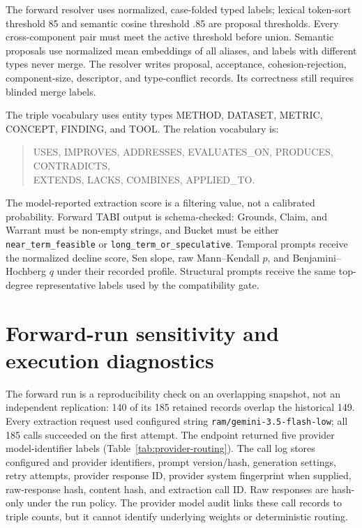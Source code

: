 \documentclass[runningheads]{llncs}
\begin{document}
The forward resolver uses normalized, case-folded typed labels; lexical token-sort threshold 85 and semantic cosine threshold .85 are proposal thresholds. Every cross-component pair must meet the active threshold before union. Semantic proposals use normalized mean embeddings of all aliases, and labels with different types never merge. The resolver writes proposal, acceptance, cohesion-rejection, component-size, descriptor, and type-conflict records. Its correctness still requires blinded merge labels.

The triple vocabulary uses entity types METHOD, DATASET, METRIC, CONCEPT, FINDING, and TOOL. The relation vocabulary is:
\begin{quote}\scriptsize
USES, IMPROVES, ADDRESSES, EVALUATES\_ON, PRODUCES, CONTRADICTS,\\
EXTENDS, LACKS, COMBINES, APPLIED\_TO.
\end{quote}
The model-reported extraction score is a filtering value, not a calibrated probability. Forward TABI output is schema-checked: Grounds, Claim, and Warrant must be non-empty strings, and Bucket must be either \texttt{near\_term\_feasible} or \texttt{long\_term\_or\_speculative}. Temporal prompts receive the normalized decline score, Sen slope, raw Mann--Kendall $p$, and Benjamini--Hochberg $q$ under their recorded profile. Structural prompts receive the same top-degree representative labels used by the compatibility gate.

\section{Forward-run sensitivity and execution diagnostics}
The forward run is a reproducibility check on an overlapping snapshot, not an independent replication: 140 of its 185 retained records overlap the historical 149. Every extraction request used configured string \texttt{ram/gemini-3.5-flash-low}; all 185 calls succeeded on the first attempt. The endpoint returned five provider model-identifier labels (Table~\ref{tab:provider-routing}). The call log stores configured and provider identifiers, prompt version/hash, generation settings, retry attempts, provider response ID, provider system fingerprint when supplied, raw-response hash, content hash, and extraction call ID. Raw responses are hash-only under the run policy. The provider model audit links these call records to triple counts, but it cannot identify underlying weights or deterministic routing.
\end{document}
